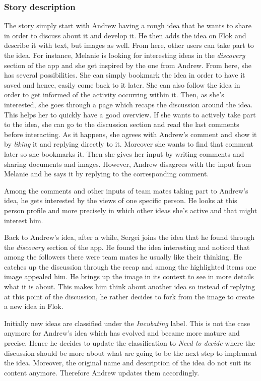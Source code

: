 \documentclass[a4paper,12pt, oneside]{article}
\begin{document}
\subsubsection*{Story description}
The story simply start with Andrew having a rough idea that he wants to share in order to discuss about it and develop it.
He then adds the idea on Flok and describe it with text, but images as well.
From here, other users can take part to the idea. For instance, Melanie is looking for interesting ideas in the \emph{discovery} section of the app and she get inspired by the one from Andrew.
From here, she has several possibilities.
She can simply bookmark the idea in order to have it saved and hence, easily come back to it later.
She can also follow the idea in order to get informed of the activity occurring within it.
Then, as she's interested, she goes through a page which recaps the discussion around the idea.
This helps her to quickly have a good overview.
If she wants to actively take part to the idea, she can go to the discussion section and read the last comments before interacting.
As it happens, she agrees with Andrew's comment and show it by \emph{liking} it and replying directly to it.
Moreover she wants to find that comment later so she bookmarks it.
Then she gives her input by writing comments and sharing documents and images.
However, Andrew disagrees with the input from Melanie and he says it by replying to the corresponding comment.

Among the comments and other inputs of team mates taking part to Andrew's idea, he gets interested by the views of one specific person.
He looks at this person profile and more precisely in which other ideas she's active and that might interest him.

Back to Andrew's idea, after a while, Sergei joins the idea that he found through the \emph{discovery} section of the app.
He found the idea interesting and noticed that among the followers there were team mates he usually like their thinking.
He catches up the discussion through the recap and among the highlighted items one image appealed him.
He brings up the image in its context to see in more details what it is about.
This makes him think about another idea so instead of replying at this point of the discussion, he rather decides to fork from the image to create a new idea in Flok.

Initially new ideas are classified under the \emph{Incubating} label.
This is not the case anymore for Andrew's idea which has evolved and became more mature and precise.
Hence he decides to update the classification to \emph{Need to decide} where the discussion should be more about what are going to be the next step to implement the idea.
Moreover, the original name and description of the idea do not suit its content anymore.
Therefore Andrew updates them accordingly.
\end{document}
